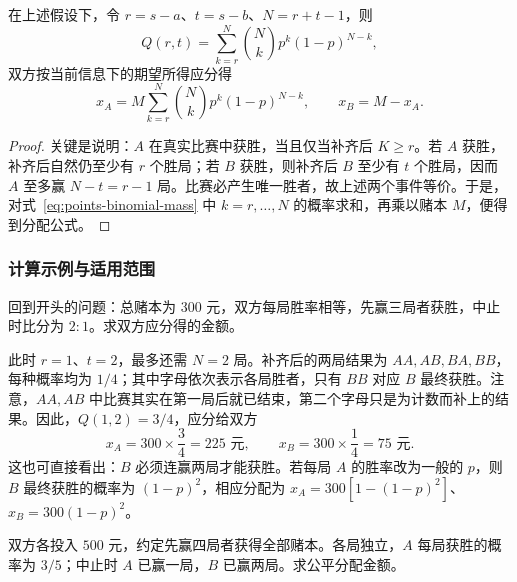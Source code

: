 \begin{proposition}
\label{prop:points-general-shares}
在上述假设下，令 $r=s-a$、$t=s-b$、$N=r+t-1$，则
\begin{equation}
  Q(r,t)=\sum_{k=r}^{N}\binom Nk p^k(1-p)^{N-k},
  \label{eq:points-binomial-tail}
\end{equation}
双方按当前信息下的期望所得应分得
\begin{equation}
  x_A=M\sum_{k=r}^{N}\binom Nk p^k(1-p)^{N-k},
  \qquad x_B=M-x_A.
  \label{eq:points-general-shares}
\end{equation}
\end{proposition}

\begin{proof}
关键是说明：$A$ 在真实比赛中获胜，当且仅当补齐后 $K\ge r$。若 $A$ 获胜，补齐后自然仍至少有 $r$ 个胜局；若 $B$ 获胜，则补齐后 $B$ 至少有 $t$ 个胜局，因而 $A$ 至多赢 $N-t=r-1$ 局。比赛必产生唯一胜者，故上述两个事件等价。于是，对式~\eqref{eq:points-binomial-mass} 中 $k=r,\ldots,N$ 的概率求和，再乘以赌本 $M$，便得到分配公式。
\end{proof}

\subsubsection{计算示例与适用范围}
\label{subsubsec:points-examples}

\begin{example}
\label{ex:points-original}
回到开头的问题：总赌本为 $300$ 元，双方每局胜率相等，先赢三局者获胜，中止时比分为 $2:1$。求双方应分得的金额。
\end{example}

\begin{solve}
此时 $r=1$、$t=2$，最多还需 $N=2$ 局。补齐后的两局结果为 $AA,AB,BA,BB$，每种概率均为 $1/4$；其中字母依次表示各局胜者，只有 $BB$ 对应 $B$ 最终获胜。注意，$AA,AB$ 中比赛其实在第一局后就已结束，第二个字母只是为计数而补上的结果。因此，$Q(1,2)=3/4$，应分给双方
\[
  x_A=300\times\frac34=225\text{ 元},\qquad
  x_B=300\times\frac14=75\text{ 元}.
\]
这也可直接看出：$B$ 必须连赢两局才能获胜。若每局 $A$ 的胜率改为一般的 $p$，则 $B$ 最终获胜的概率为 $(1-p)^2$，相应分配为 $x_A=300[1-(1-p)^2]$、$x_B=300(1-p)^2$。
\end{solve}

\begin{example}
\label{ex:points-biased}
双方各投入 $500$ 元，约定先赢四局者获得全部赌本。各局独立，$A$ 每局获胜的概率为 $3/5$；中止时 $A$ 已赢一局，$B$ 已赢两局。求公平分配金额。
\end{example}

